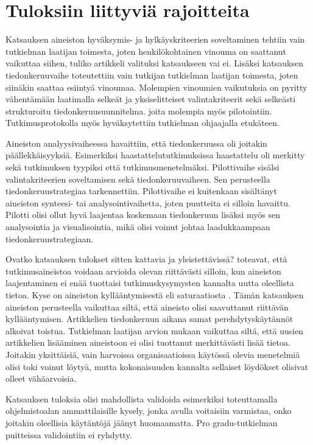 \documentclass[utf8]{gradu3}
\begin{document}
\section{Tuloksiin liittyviä rajoitteita}

Katsauksen aineiston hyväksymis- ja hylkäyskriteerien soveltaminen tehtiin vain tutkielman laatijan toimesta, joten henkilökohtainen vinouma on saattanut vaikuttaa siihen, tuliko artikkeli valituksi katsaukseen vai ei. Lisäksi katsauksen tiedonkeruuvaihe toteutettiin vain tutkijan tutkielman laatijan toimesta, joten siinäkin saattaa esiintyä vinoumaa. Molempien vinoumien vaikutuksia on pyritty vähentämään laatimalla selkeät ja yksiselitteiset valintakriteerit sekä selkeästi strukturoitu tiedonkeruusuunnitelma. joita molempia myös pilotointiin. Tutkimusprotokolla myös hyväksytettiin tutkielman ohjaajalla etukäteen.

Aineiston analyysivaiheessa havaittiin, että tiedonkeruussa oli joitakin päällekkäisyyksiä. Esimerkiksi haastattelututkimuksissa haastattelu oli merkitty sekä tutkimuksen tyypiksi että tutkimusmenetelmäksi. Pilottivaihe sisälsi valintakriteerien soveltamisen sekä tiedonkeruuvaiheen. Sen perusteella tiedonkeruustrategiaa tarkennettiin. Pilottivaihe ei kuitenkaan sisältänyt aineiston synteesi- tai analysointivaihetta, joten puutteita ei silloin havaittu. Pilotti olisi ollut hyvä laajentaa koskemaan tiedonkeruun lisäksi myös sen analysointia ja visualisointia, mikä olisi voinut johtaa laadukkaampaan tiedonkeruustrategiaan.

Ovatko katsauksen tulokset sitten kattavia ja yleistettävissä? \textcite{eskola-suoranta-1998} toteavat, että tutkimusaineistoa voidaan arvioida olevan riittävästi silloin, kun aineiston laajentaminen ei enää tuottaisi tutkimuskysymysten kannalta uutta oleellista tietoa. Kyse on aineiston kyllääntymisestä eli saturaatiosta \parencite{eskola-suoranta-1998}. Tämän katsauksen aineiston perusteella vaikuttaa siltä, että aineisto olisi saavuttanut riittävän kyllääntymisen. Artikkelien tiedonkeruun aikana samat perehdytyskäytännöt alkoivat toistua. Tutkielman laatijan arvion mukaan vaikuttaa siltä, että uusien artikkelien lisääminen aineistoon ei olisi tuottanut merkittävästi lisää tietoa. Joitakin yksittäisiä, vain harvoissa organisaatioissa käytössä olevia menetelmiä olisi toki voinut löytyä, mutta kokonaisuuden kannalta sellaiset löydökset olisivat olleet vähäarvoisia. 

Katsauksen tuloksia olisi mahdollista validoida esimerkiksi toteuttamalla ohjelmistoalan ammattilaisille kysely, jonka avulla voitaisiin varmistaa, onko joitakin oleellisia käytäntöjä jäänyt huomaamatta. Pro gradu-tutkielman puitteissa validointiin ei ryhdytty. 
\end{document}
